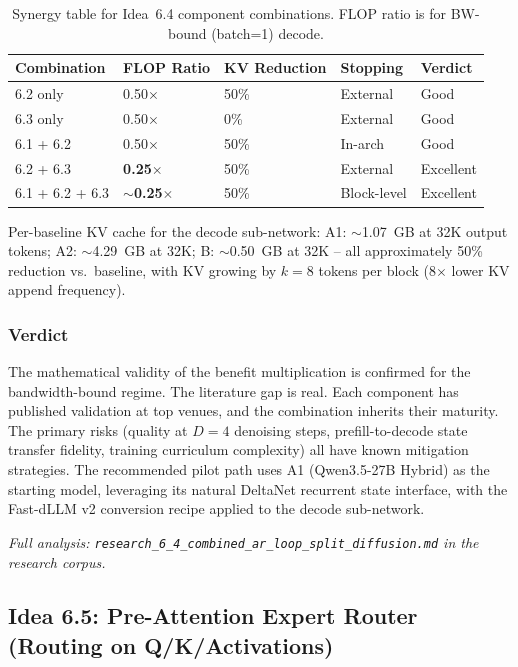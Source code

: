\documentclass[11pt]{article}
\begin{document}
\begin{table}[h]
\centering
\caption{Synergy table for Idea~6.4 component combinations. FLOP ratio is for BW-bound (batch=1) decode.}
\label{tab:idea64_synergy}
\small
\begin{tabular}{lllll}
\hline
\textbf{Combination} & \textbf{FLOP Ratio} & \textbf{KV Reduction} & \textbf{Stopping} & \textbf{Verdict} \\
\hline
6.2 only & 0.50$\times$ & 50\% & External & Good \\
6.3 only & 0.50$\times$ & 0\% & External & Good \\
6.1 + 6.2 & 0.50$\times$ & 50\% & In-arch & Good \\
6.2 + 6.3 & \textbf{0.25$\times$} & 50\% & External & Excellent \\
6.1 + 6.2 + 6.3 & \textbf{$\sim$0.25$\times$} & 50\% & Block-level & Excellent \\
\hline
\end{tabular}
\end{table}

Per-baseline KV cache for the decode sub-network: A1: $\sim$1.07~GB at 32K output tokens; A2: $\sim$4.29~GB at 32K; B: $\sim$0.50~GB at 32K -- all approximately 50\% reduction vs.\ baseline, with KV growing by $k=8$ tokens per block (8$\times$ lower KV append frequency).

\subsubsection*{Verdict}

The mathematical validity of the benefit multiplication is confirmed for the bandwidth-bound regime. The literature gap is real. Each component has published validation at top venues, and the combination inherits their maturity. The primary risks (quality at $D=4$ denoising steps, prefill-to-decode state transfer fidelity, training curriculum complexity) all have known mitigation strategies. The recommended pilot path uses A1 (Qwen3.5-27B Hybrid) as the starting model, leveraging its natural DeltaNet recurrent state interface, with the Fast-dLLM v2 conversion recipe applied to the decode sub-network.

\par\noindent\textit{Full analysis: \texttt{research\_6\_4\_combined\_ar\_loop\_split\_diffusion.md} in the research corpus.}


\subsection{Idea 6.5: Pre-Attention Expert Router (Routing on Q/K/Activations)}
\label{subsec:idea65detail}
\end{document}
